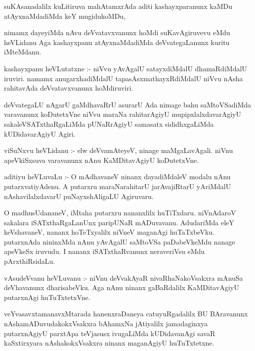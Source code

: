 \documentclass{article}
\begin{document}
\begin{mn}
suKAsanadalilx kuLitiruva mahAtamxrAda aditi kashayxparanunx kaMDu 
atAyxnaMdadiMda keY mugidukoMDu,
\end{mn}

\begin{mn}
nimamx dayeyiMda nAvu deVvatavxvanunx hoMdi suKavAgiruvevu eMdu 
heVLidanu Aga kashayxpanu atAyxnaMdadiMda deVvategaLanunx kuritu iMteMdanu.
\end{mn}

\begin{mn}
kashayxpanu heVLutatxne :- niVvu yAvAgalU satayxdiMdalU dhamaRdiMdalU 
iruviri.  namamx anugarxhadiMdalU tapasAsxmathayxRdiMdalU niVvu nAsha 
rahitavAda deVvatavxvanunx hoMdiruviri.
\end{mn}

\begin{mn}
deVvategaLU nAgarU gaMdhavaRrU asurarU Ada nimage bahu saMtoVSadiMda 
varavanunx koDutetxVne niVvu maraNa rahitarAgiyU mupipxlalxdavarAgiyU
sakaleVSATxthaRgaLiMda pUNaRrAgiyU samasatx sididhxgaLiMda kUDidavarAgiyU Agiri.
\end{mn}

\begin{mn}
viSuNxvu heVLidanu :- elw deVvamAteyeV, ninage maMgaLavAgali. niVnu 
apeVkiSxsuva varavanunx nAnu KaMDitavAgiyU koDutetxVne.
\end{mn}

\begin{mn}
aditiyu heVLuvaLu :- O mAdhavaneV ninanx dayadiMdaleV modalu nAnu 
putarxvatiyAdenu. A putarxru maraNarahitarU jarAvajiRtarU yAriMdalU 
nAshavilalxdavarU puNayxshAligaLU Agiruvaru.
\end{mn}

\begin{mn}
O madhusUdananeV, iMtaha putarxru nananxlilx huTiTxdaru. niVnAdaroV
sakalara iSATxthaRgaLanUnx paripUNaR mADuvavanu. AdudariMda eleY 
keVshavaneV, nananx hoTeTxyalilx niVneV maganAgi huTaTxbeVku. putarxnAda 
nininxMda nAnu yAvAgalU saMtoVSa paDabeVkeMdu nanage apeVkeSx iruvudu.
 I nananx iSATxthaRvanunx neraveriVsu eMdu pArxthiRsidaLu.
\end{mn}

\begin{mn}
vAsudeVvanu heVLuvanu :- niVnu deVvakAyaR nivaRhaNakoVsakxra mAnuSa 
deVhavanunx dharisabeVku. Aga nAnu ninanx gaBaRdalilx KaMDitavAgiyU 
putarxnAgi huTuTxtetxVne.
\end{mn}

\begin{mn}
veYvasavxtamanavxMtarada hanenxraDaneya catuyuRgadalilx BU BAravanunx
nAshamADuvudakokxVsakxra bAhamxNa jAtiyalilx jamadaginxya putarxnAgiyU 
parxtApa teVjasusx ivugaLiMda kUDidavanAgi savaR kaSxtirxyara nAshakokxVsakxra
ninanx maganAgiyU huTuTxtetxne.
\end{mn}
\end{document}
